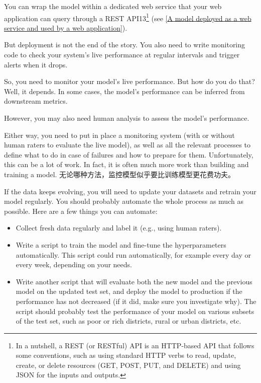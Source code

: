 You can wrap the model within a dedicated web service that your web application can query through a REST API13\footnote{In a nutshell, a REST (or RESTful) API is an HTTP-based API that follows some conventions, such as using standard HTTP verbs to read, update, create, or delete resources (GET, POST, PUT, and DELETE) and using JSON for the inputs and outputs.} (see \autoref{A model deployed as a web service and used by a web application}).

But deployment is not the end of the story. You also need to write monitoring code to check your system's live performance at regular intervals and trigger alerts when it drops. 

So, you need to monitor your model's live performance. But how do you do that? Well, it depends. In some cases, the model's performance can be inferred from downstream metrics. 

However, you may also need human analysis to assess the model's performance.

Either way, you need to put in place a monitoring system (with or without human raters to evaluate the live model), as well as all the relevant processes to define what to do in case of failures and how to prepare for them. Unfortunately, this can be a lot of work. In fact, it is often much more work than building and training a model. 无论哪种方法，监控模型似乎要比训练模型更花费功夫。

If the data keeps evolving, you will need to update your datasets and retrain your model regularly. You should probably automate the whole process as much as possible. Here are a few things you can automate:
\begin{itemize}
    \item Collect fresh data regularly and label it (e.g., using human raters).
    \item Write a script to train the model and fine-tune the hyperparameters automatically. This script could run automatically, for example every day or every week, depending on your needs.
    \item Write another script that will evaluate both the new model and the previous model on the updated test set, and deploy the model to production if the performance has not decreased (if it did, make sure you investigate why). The script should probably test the performance of your model on various subsets of the test set, such as poor or rich districts, rural or urban districts, etc.
\end{itemize}

